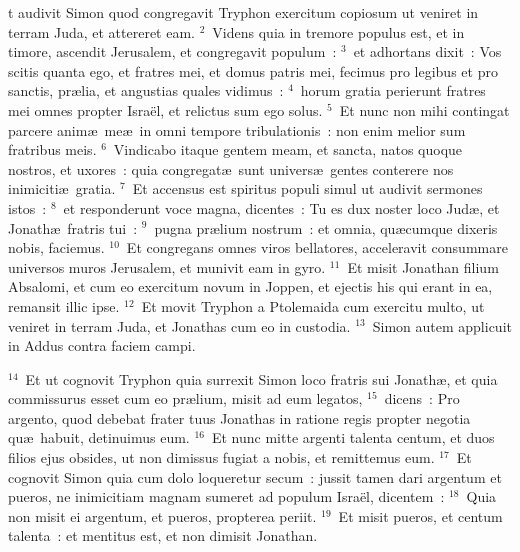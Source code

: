 \bchapter
{}t audivit Simon quod congregavit Tryphon exercitum copiosum ut veniret in terram Juda, et attereret eam.
${}^{2}$~Videns quia in tremore populus est, et in timore, ascendit Jerusalem, et congregavit populum~:
${}^{3}$~et adhortans dixit~: Vos scitis quanta ego, et fratres mei, et domus patris mei, fecimus pro legibus et pro sanctis, pr\ae lia, et angustias quales vidimus~:
${}^{4}$~horum gratia perierunt fratres mei omnes propter Isra\"el, et relictus sum ego solus.
${}^{5}$~Et nunc non mihi contingat parcere anim\ae\ me\ae\ in omni tempore tribulationis~: non enim melior sum fratribus meis.
${}^{6}$~Vindicabo itaque gentem meam, et sancta, natos quoque nostros, et uxores~: quia congregat\ae\ sunt univers\ae\ gentes conterere nos inimiciti\ae\ gratia.
${}^{7}$~Et accensus est spiritus populi simul ut audivit sermones istos~:
${}^{8}$~et responderunt voce magna, dicentes~: Tu es dux noster loco Jud\ae , et Jonath\ae\ fratris tui~:
${}^{9}$~pugna pr\ae lium nostrum~: et omnia, qu\ae cumque dixeris nobis, faciemus.
${}^{10}$~Et congregans omnes viros bellatores, acceleravit consummare universos muros Jerusalem, et munivit eam in gyro.
${}^{11}$~Et misit Jonathan filium Absalomi, et cum eo exercitum novum in Joppen, et ejectis his qui erant in ea, remansit illic ipse.
${}^{12}$~Et movit Tryphon a Ptolemaida cum exercitu multo, ut veniret in terram Juda, et Jonathas cum eo in custodia.
${}^{13}$~Simon autem applicuit in Addus contra faciem campi.


${}^{14}$~Et ut cognovit Tryphon quia surrexit Simon loco fratris sui Jonath\ae , et quia commissurus esset cum eo pr\ae lium, misit ad eum legatos,
${}^{15}$~dicens~: Pro argento, quod debebat frater tuus Jonathas in ratione regis propter negotia qu\ae\ habuit, detinuimus eum.
${}^{16}$~Et nunc mitte argenti talenta centum, et duos filios ejus obsides, ut non dimissus fugiat a nobis, et remittemus eum.
${}^{17}$~Et cognovit Simon quia cum dolo loqueretur secum~: jussit tamen dari argentum et pueros, ne inimicitiam magnam sumeret ad populum Isra\"el, dicentem~:
${}^{18}$~Quia non misit ei argentum, et pueros, propterea periit.
${}^{19}$~Et misit pueros, et centum talenta~: et mentitus est, et non dimisit Jonathan.


